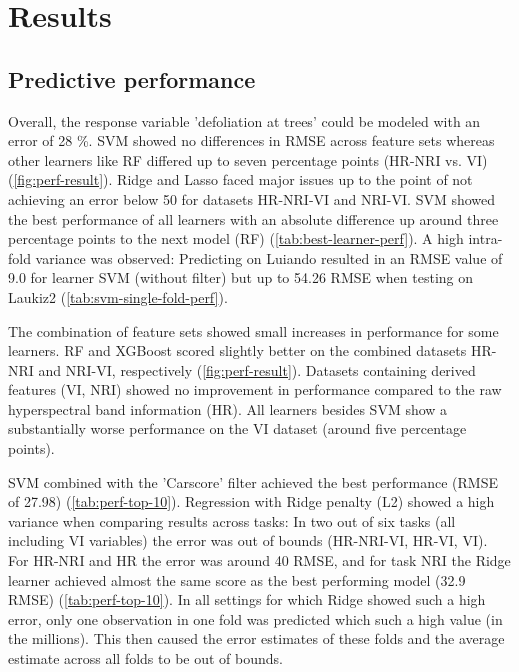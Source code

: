 \documentclass[letterpaper, peerreview]{IEEEtran}
\begin{document}
\section{Results}

\subsection{Predictive performance}

\noindent Overall, the response variable 'defoliation at trees' could be modeled with an error of 28 \%.
SVM showed no differences in RMSE across feature sets whereas other learners like RF differed up to seven percentage points (HR-NRI vs. VI) (\autoref{fig:perf-result}).
Ridge and Lasso faced major issues up to the point of not achieving an error below 50 for datasets HR-NRI-VI and NRI-VI.
SVM showed the best performance of all learners with an absolute difference up around three percentage points to the next model (RF) (\autoref{tab:best-learner-perf}).
A high intra-fold variance was observed: Predicting on Luiando resulted in an RMSE value of 9.0 for learner SVM (without filter) but up to 54.26 RMSE when testing on Laukiz2 (\autoref{tab:svm-single-fold-perf}).

The combination of feature sets showed small increases in performance for some learners.
RF and XGBoost scored slightly better on the combined datasets HR-NRI and NRI-VI, respectively (\autoref{fig:perf-result}).
Datasets containing derived features (VI, NRI) showed no improvement in performance compared to the raw hyperspectral band information (HR).
All learners besides SVM show a substantially worse performance on the VI dataset (around five percentage points).

SVM combined with the 'Carscore' filter achieved the best performance (RMSE of 27.98) (\autoref{tab:perf-top-10}).
Regression with Ridge penalty (L2) showed a high variance when comparing results across tasks: In two out of six tasks (all including VI variables) the error was out of bounds (HR-NRI-VI, HR-VI, VI). For HR-NRI and HR the error was around 40 RMSE, and for task NRI the Ridge learner achieved almost the same score as the best performing model (32.9 RMSE) (\autoref{tab:perf-top-10}).
In all settings for which Ridge showed such a high error, only one observation in one fold was predicted which such a high value (in the millions).
This then caused the error estimates of these folds and the average estimate across all folds to be out of bounds.
\end{document}

